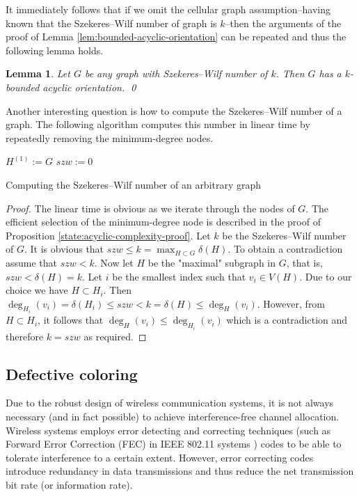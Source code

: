 \documentclass[a4paper, 12pt]{article}
\newtheorem{lem}{Lemma}[section]
\begin{document}
It immediately follows that if we omit the cellular graph assumption\---having known that the Szekeres\---Wilf number of graph is $k$\---then the arguments of the proof of Lemma \ref{lem:bounded-acyclic-orientation} can be repeated and thus the following lemma holds.

\begin{lem}\label{lem:szekeres} Let $G$ be any graph with Szekeres\---Wilf number of $k$. Then $G$ has a $k$-bounded acyclic orientation. \qed
\end{lem}

Another interesting question is how to compute the Szekeres\---Wilf number of a graph. The following algorithm \cite{Matula:1983:SOC:2402.322385} computes this number in linear time by repeatedly removing the minimum-degree nodes.

\begin{algorithm}[h!]\label{alg:szekeres-wilf-computation}
 $H^{(1)} := G$\;
 $szw := 0$\;
 \caption{Computing the Szekeres\---Wilf number of an arbitrary graph}
\end{algorithm}
\begin{proof}
The linear time is obvious as we iterate through the nodes of $G$. The efficient selection of the minimum-degree node is described in the proof of Proposition \ref{state:acyclic-complexity-proof}. Let $k$ be the Szekeres\---Wilf number of $G$. It is obvious that $szw \leqslant k = \max_{H \subset G} \delta(H)$. To obtain a contradiction assume that $szw < k$. Now let $H$ be the "maximal" subgraph in $G$, that is, $szw < \delta(H) = k$. Let $i$ be the smallest index such that $v_i \in V(H)$. Due to our choice we have $H \subset H_i$. Then $\deg_{H_i}(v_i) = \delta(H_i) \leqslant szw < k = \delta(H) \leqslant \deg_H(v_i)$. However, from $H \subset H_i$, it follows that $\deg_H(v_i) \leqslant \deg_{H_i}(v_i)$ which is a contradiction and therefore $k = szw$ as required.
\end{proof}

\subsection{Defective coloring}\label{sec:defective}
Due to the robust design of wireless communication systems, it is not always necessary (and in fact possible) to achieve interference-free channel allocation. Wireless systems employs error detecting and correcting techniques (such as Forward Error Correction (FEC) in IEEE 802.11 systems \cite{ieee80211}) codes to be able to tolerate interference to a certain extent. However, error correcting codes introduce redundancy in data transmissions and thus reduce the net transmission bit rate (or information rate).
\end{document}
